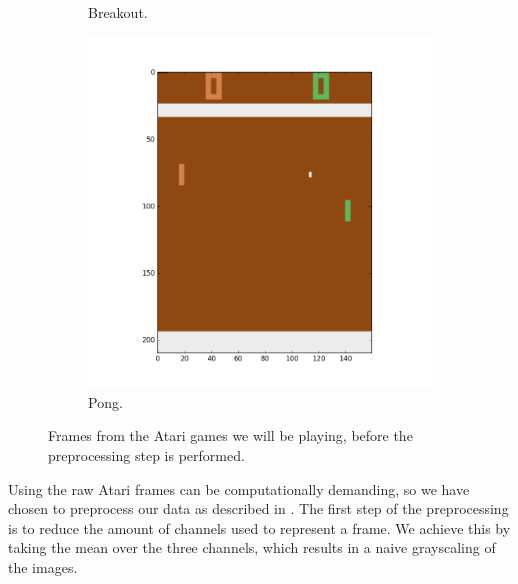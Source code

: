 \documentclass[11pt]{article}
\begin{document}
\begin{figure}[H]
\begin{subfigure}{.3\textwidth}
        \caption{Breakout.}
        \label{fig:scanlike}
    \end{subfigure}
    \begin{subfigure}{.3\textwidth}
        \centering
        \includegraphics[scale=0.25]{include/pong_1.png}
        \caption{Pong.}
        \label{fig:scan}
    \end{subfigure}
    \caption{Frames from the Atari games we will be playing, before the preprocessing step is performed.}
     \label{fig:games}
\end{figure}
Using the raw Atari frames can be computationally demanding, so we have chosen
to preprocess our data as described in \cite{dqn}. 
The first step of the preprocessing is to reduce the amount of channels used to
represent a frame.
We achieve this by taking the mean over the three channels, which results
in a naive grayscaling of the images.
\end{document}
